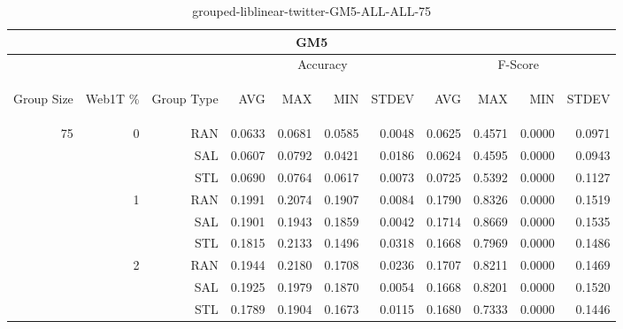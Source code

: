 \begin{center}
\begin{table}[htbp]
\begin{tabular}{ | r | r | r | r | r | r | r | r | r | r | r |}
\hline
\multicolumn{11}{|c|}{GM5}\\
\hline
 & & & \multicolumn{4}{|c|}{Accuracy} & \multicolumn{4}{|c|}{F-Score}\\ \cline{4-11}
\begin{sideways}Group Size\end{sideways} & \begin{sideways}Web1T \%\end{sideways} & \begin{sideways}Group Type\end{sideways} & \begin{sideways}AVG\end{sideways} & \begin{sideways}MAX\end{sideways} & \begin{sideways}MIN\end{sideways} & \begin{sideways}STDEV\end{sideways} & \begin{sideways}AVG\end{sideways} & \begin{sideways}MAX\end{sideways} & \begin{sideways}MIN\end{sideways} & \begin{sideways}STDEV\end{sideways}\\
\hline
\multirow{9}{*}{75}
 & \multirow{3}{*}{0} & RAN & 0.0633 & 0.0681 & 0.0585 & 0.0048 & 0.0625 & 0.4571 & 0.0000 & 0.0971\\ \cline{3-11}
 &   & SAL & 0.0607 & 0.0792 & 0.0421 & 0.0186 & 0.0624 & 0.4595 & 0.0000 & 0.0943\\ \cline{3-11}
 &   & STL & 0.0690 & 0.0764 & 0.0617 & 0.0073 & 0.0725 & 0.5392 & 0.0000 & 0.1127\\ \cline{2-11}
 & \multirow{3}{*}{1} & RAN & 0.1991 & 0.2074 & 0.1907 & 0.0084 & 0.1790 & 0.8326 & 0.0000 & 0.1519\\ \cline{3-11}
 &   & SAL & 0.1901 & 0.1943 & 0.1859 & 0.0042 & 0.1714 & 0.8669 & 0.0000 & 0.1535\\ \cline{3-11}
 &   & STL & 0.1815 & 0.2133 & 0.1496 & 0.0318 & 0.1668 & 0.7969 & 0.0000 & 0.1486\\ \cline{2-11}
 & \multirow{3}{*}{2} & RAN & 0.1944 & 0.2180 & 0.1708 & 0.0236 & 0.1707 & 0.8211 & 0.0000 & 0.1469\\ \cline{3-11}
 &   & SAL & 0.1925 & 0.1979 & 0.1870 & 0.0054 & 0.1668 & 0.8201 & 0.0000 & 0.1520\\ \cline{3-11}
 &   & STL & 0.1789 & 0.1904 & 0.1673 & 0.0115 & 0.1680 & 0.7333 & 0.0000 & 0.1446\\ \cline{2-11}
\hline
\end{tabular}
\caption{grouped-liblinear-twitter-GM5-ALL-ALL-75}
\end{table}
\end{center}

